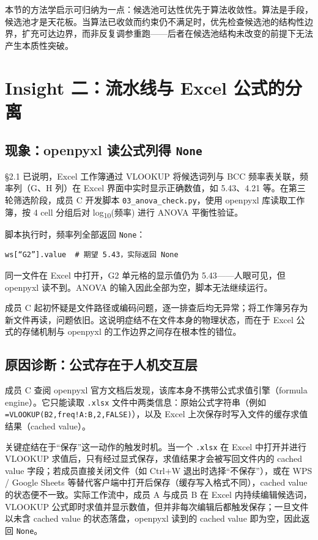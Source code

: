 \documentclass[12pt, a4paper]{article}
\begin{document}
本节的方法学启示可归纳为一点：候选池可达性优先于算法收敛性。算法是手段，候选池才是天花板。当算法已收敛而约束仍不满足时，优先检查候选池的结构性边界，扩充可达边界，而非反复调参重跑——后者在候选池结构未改变的前提下无法产生本质性突破。

\section{Insight 二：流水线与 Excel 公式的分离}
\label{sec:finding2}

\subsection{现象：openpyxl 读公式列得 \texttt{None}}

§2.1 已说明，Excel 工作簿通过 VLOOKUP 将候选词列与 BCC 频率表关联，频率列（G、H 列）在 Excel 界面中实时显示正确数值，如 5.43、4.21 等。在第三轮筛选阶段，成员 C 开发脚本 \texttt{03\_anova\_check.py}，使用 openpyxl 库读取工作簿，按 4 cell 分组后对 log\textsubscript{10}(频率) 进行 ANOVA 平衡性验证。

脚本执行时，频率列全部返回 \texttt{None}：

\begin{verbatim}
ws[“G2”].value  # 期望 5.43，实际返回 None
\end{verbatim}

同一文件在 Excel 中打开，G2 单元格的显示值仍为 5.43——人眼可见，但 openpyxl 读不到。ANOVA 的输入因此全部为空，脚本无法继续运行。

成员 C 起初怀疑是文件路径或编码问题，逐一排查后均无异常；将工作簿另存为新文件再读，问题依旧。这说明症结不在文件本身的物理状态，而在于 Excel 公式的存储机制与 openpyxl 的工作边界之间存在根本性的错位。

\subsection{原因诊断：公式存在于人机交互层}

成员 C 查阅 openpyxl 官方文档后发现，该库本身不携带公式求值引擎（formula engine）。它只能读取 \texttt{.xlsx} 文件中两类信息：原始公式字符串（例如 \texttt{=VLOOKUP(B2,freq!A:B,2,FALSE)}），以及 Excel 上次保存时写入文件的缓存求值结果（cached value）。

关键症结在于“保存”这一动作的触发时机。当一个 \texttt{.xlsx} 在 Excel 中打开并进行 VLOOKUP 求值后，只有经过显式保存，求值结果才会被写回文件内的 cached value 字段；若成员直接关闭文件（如 Ctrl+W 退出时选择“不保存”），或在 WPS / Google Sheets 等替代客户端中打开后保存（缓存写入格式不同），cached value 的状态便不一致。实际工作流中，成员 A 与成员 B 在 Excel 内持续编辑候选词，VLOOKUP 公式即时求值并显示数值，但并非每次编辑后都触发保存；一旦文件以未含 cached value 的状态落盘，openpyxl 读到的 cached value 即为空，因此返回 \texttt{None}。
\end{document}
